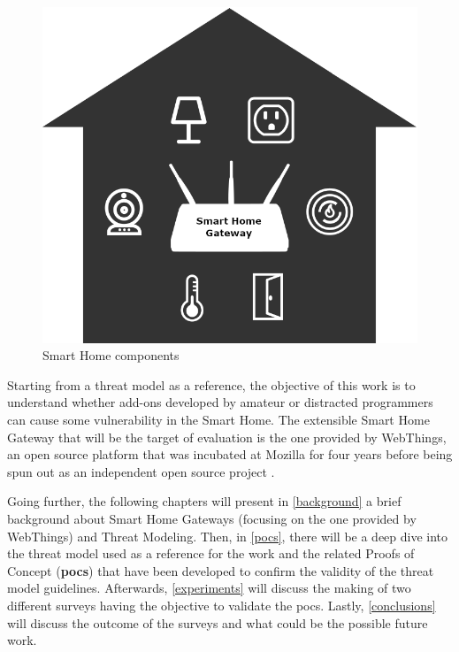 \begin{figure}[H]
    \centering
    \includegraphics[scale=0.60]{images/introduction/shg_arch.png}
    \caption{Smart Home components \cite{wtabout}}
    \label{shcomponents}
\end{figure}

Starting from a threat model as a reference, the objective of this work is to understand whether add-ons developed by amateur or distracted programmers can cause some vulnerability in the Smart Home. The extensible Smart Home Gateway that will be the target of evaluation is the one provided by WebThings, an open source platform that was incubated at Mozilla for four years before being spun out as an independent open source project \cite{francismozilla, wtabout}.

Going further, the following chapters will present in \autoref{background} a brief background about Smart Home Gateways (focusing on the one provided by WebThings) and Threat Modeling. Then, in \autoref{pocs}, there will be a deep dive into the threat model used as a reference for the work and the related Proofs of Concept (\textbf{\glspl{poc}}) that have been developed to confirm the validity of the threat model guidelines. Afterwards, \autoref{experiments} will discuss the making of two different surveys having the objective to validate the \glspl{poc}. Lastly, \autoref{conclusions} will discuss the outcome of the surveys and what could be the possible future work.